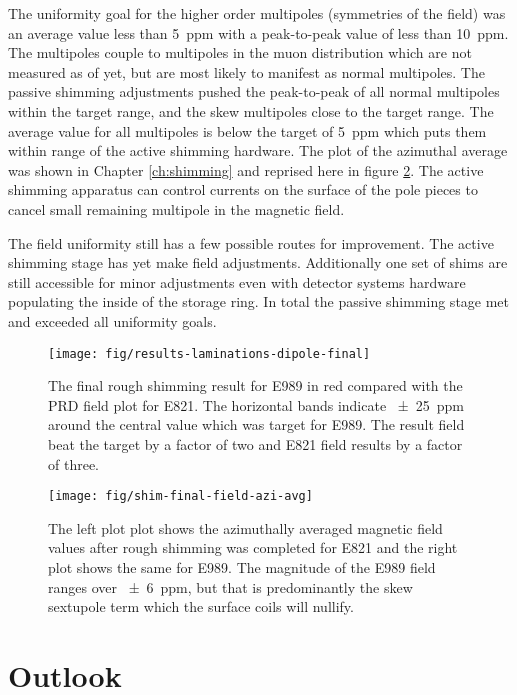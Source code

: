 The uniformity goal for the higher order multipoles (symmetries of the field) was an average value less than \SI{5}{ppm} with a peak-to-peak value of less than \SI{10}{ppm}.  The multipoles couple to multipoles in the muon distribution which are not measured as of yet, but are most likely to manifest as normal multipoles.  The passive shimming adjustments pushed the peak-to-peak of all normal multipoles within the target range, and the skew multipoles close to the target range.  The average value for all multipoles is below the target of \SI{5}{ppm} which puts them within range of the active shimming hardware.  The plot of the azimuthal average was shown in Chapter \ref{ch:shimming} and reprised here in figure \ref{fig:conclusion-azi-avg}.  The active shimming apparatus can control currents on the surface of the pole pieces to cancel small remaining multipole in the magnetic field.

The field uniformity still has a few possible routes for improvement.  The active shimming stage has yet make field adjustments.  Additionally one set of shims are still accessible for minor adjustments even with \mugmtwo detector systems hardware populating the inside of the storage ring. In total the passive shimming stage met and exceeded all uniformity goals.

\begin{figure}
\centering
\texttt{[image: fig/results-laminations-dipole-final]}
\caption{The final rough shimming result for E989 in red compared with the PRD field plot for E821.  The horizontal bands indicate \SI{\pm 25}{ppm} around the central value which was target for E989.  The result field beat the target by a factor of two and E821 field results by a factor of three. \label{fig:conclusions-dipole-final}}
\end{figure}

\begin{figure}
\centering
\texttt{[image: fig/shim-final-field-azi-avg]}
\caption{
    The left plot plot shows the azimuthally averaged magnetic field values after rough shimming was completed for E821 and the right plot shows the same for E989.  The magnitude of the E989 field ranges over \SI{\pm 6}{ppm}, but that is predominantly the skew sextupole term which the surface coils will nullify.
    \label{fig:conclusion-azi-avg}
}
\end{figure}

\section{Outlook}

